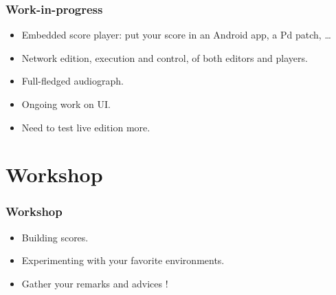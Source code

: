 \documentclass[handout]{beamer}
\begin{document}
\begin{frame}
\frametitle{Work-in-progress}
\Large
\begin{itemize}
    \item<1> Embedded score player: put your score in an Android app, a Pd patch, \dots
    \item<2> Network edition, execution and control, of both editors and players. 
    \item<3> Full-fledged audiograph.
    \item<4> Ongoing work on UI.
    \item<5> Need to test live edition more.
\end{itemize}
\end{frame}

\section{Workshop}

\begin{frame}
\frametitle{Workshop}
\Large
\begin{itemize}
    \item Building scores.
    \item Experimenting with your favorite environments.
    \item Gather your remarks and advices !
\end{itemize}
\end{frame}
\end{document}
